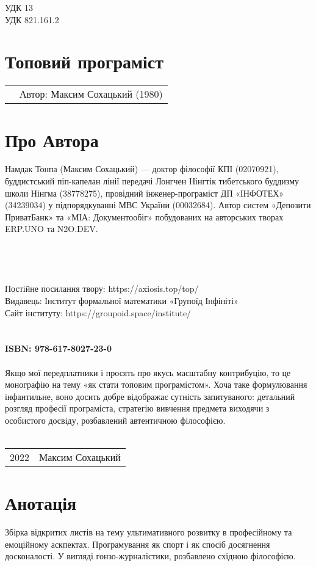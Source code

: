 \noindent УДК 13\\
УДК 821.161.2

\section*{Топовий програміст \top}

\begin{tabular}{ll}
& Автор: Максим Сохацький (1980)\\
\end{tabular}

\section*{Про Автора}
Намдак Тонпа (Максим Сохацький) --- доктор філософії КПІ (02070921),
буддистський піп-капелан лінії передачі
Лонгчен Нінгтік тибетського буддизму школи Нінгма (38778275),
провідний інженер-програміст ДП «ІНФОТЕХ» (34239034)
у підпорядкуванні МВС України (00032684).
Автор систем «Депозити ПриватБанк» та «МІА: Документообіг»
побудованих на авторських творах ERP.UNO та N2O.DEV.
\\
\\
\\
\\
\\
Постійне посилання твору: https://axiosis.top/top/ \\
Видавець: Інститут формальної математики «Групоїд Інфініті» \\
Сайт інституту: https://groupoid.space/institute/ \\
\\
\\
{\bf ISBN: 978-617-8027-23-0 \hspace{2em}}
\\
\\
\small
\indent Якщо мої передплатники і просять про якусь масштабну контрибуцію,
то це монографію на тему «як стати топовим програмістом».
Хоча таке формулювання інфантильне, воно досить добре
відображає сутність запитуваного: детальний розгляд професії
програміста, стратегію вивчення предмета виходячи з особистого
досвіду, розбавлений автентичною філософією.
\\
\\
\begin{tabular}{ll}
\textcopyright{} 2022 & Максим Сохацький
\end{tabular}

\newpage
\section*{Анотація}
Збірка відкритих листів на тему ультимативного розвитку в
професійному та емоційному аскпектах. Програмування як
спорт і як спосіб досягнення досконалості. У вигляді
гонзо-журналістики, розбавлено східною філософією.

